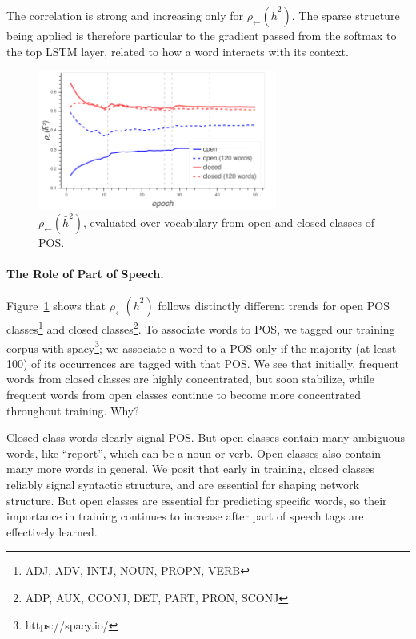 The correlation is strong and increasing only for $\rho_{\leftarrow}(\bar{h}^2)$. The sparse structure being applied is therefore particular to the gradient passed from the softmax to the top LSTM layer, related to how a word interacts with its context.

\begin{figure}\centering
\includegraphics[width=0.7\textwidth]{sparsity/open_close}
\caption{$\rho_{\leftarrow}(\bar{h}^2)$, evaluated over vocabulary from open and closed classes of POS.}
 \label{fig:open_close}
\end{figure}

\paragraph{The Role of Part of Speech.}
Figure~\ref{fig:open_close} shows that $\rho_{\leftarrow}(\bar{h}^2)$ follows distinctly different trends for open POS classes\footnote{ADJ, ADV, INTJ, NOUN, PROPN, VERB} and closed classes\footnote{ADP, AUX, CCONJ, DET, PART, PRON, SCONJ}. 
To associate words to POS, we tagged our training corpus with spacy\footnote{https://spacy.io/}; we associate a word to a POS only if the majority (at least 100) of its occurrences are tagged with that POS.
We see that initially, frequent words from closed classes are highly concentrated, but soon stabilize, while frequent words from open classes continue to become more concentrated throughout training. Why?

Closed class words clearly signal POS. But open classes contain many ambiguous words, like ``report'', which can be a noun or verb. Open classes also contain many more words in general. We posit that early in training, closed classes reliably signal syntactic structure, and are essential for shaping network structure. But open classes are essential for  predicting specific words, so their importance in training continues to increase after part of speech tags are effectively learned. 

